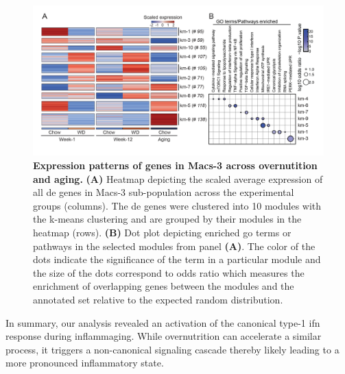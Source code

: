 \begin{figure}[t]
\centering
\includegraphics[width=\linewidth]{Chapter4/Fig/F2-11-02.png}
\caption[Expression patterns of  genes in Macs-3 across overnutition and aging]{\textbf{Expression patterns of  genes in Macs-3 across overnutition and aging.} \textbf{(A)} Heatmap depicting the scaled average expression of all \gls{de} genes in Macs-3 sub-population across the experimental groups (columns). The \gls{de} genes were clustered into 10 modules with the k-means clustering and are grouped by their modules in the heatmap (rows). \textbf{(B)} Dot plot depicting enriched \gls{go} terms or pathways in the selected modules from panel \textbf{(A)}. The color of the dots indicate the significance of the term in a particular module and the size of the dots correspond to odds ratio which measures the enrichment of overlapping genes between the modules and the annotated set relative to the expected random distribution.}
\label{fig:chp2_scrna_macrophages_macs3_clust}
\end{figure}

\par In summary, our analysis revealed an activation of the canonical type-1 \gls{ifn} response during inflammaging. While overnutrition can accelerate a similar process, it triggers a non-canonical signaling cascade thereby likely leading to a more pronounced inflammatory state.


\clearpage


